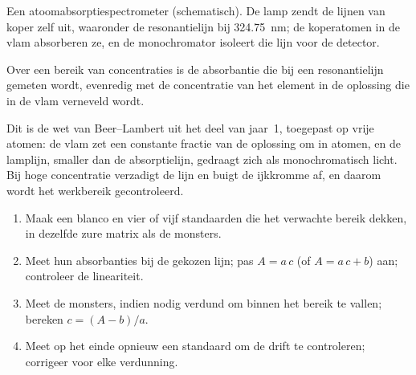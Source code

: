 \begin{omfigure}
\par\vspace{4pt}

{\small Een atoomabsorptiespectrometer (schematisch). De lamp zendt de lijnen van koper zelf uit, waaronder
de resonantielijn bij \qty{324.75}{nm}; de koperatomen in de vlam absorberen ze, en de
monochromator isoleert die lijn voor de detector.}
\end{omfigure}

\begin{proposition}\label{prop:b2:mass-spec-atomic:aas}
Over een bereik van concentraties is de absorbantie die bij een resonantielijn gemeten wordt, evenredig met de
concentratie van het element in de oplossing die in de vlam verneveld wordt.
\end{proposition}

\admitted

Dit is de wet van Beer--Lambert uit het deel van jaar~1, toegepast op vrije atomen: de vlam zet een constante
fractie van de oplossing om in atomen, en de lamplijn, smaller dan de absorptielijn, gedraagt zich als
monochromatisch licht. Bij hoge concentratie verzadigt de lijn en buigt de ijkkromme af, en daarom
wordt het werkbereik gecontroleerd.

\begin{method}\label{met:b2:mass-spec-atomic:aas-calibration}
\begin{enumerate}
  \item Maak een blanco en vier of vijf standaarden die het verwachte bereik dekken, in dezelfde zure
        matrix als de monsters.
  \item Meet hun absorbanties bij de gekozen lijn; pas $A = a\,c$ (of $A = a\,c + b$) aan; controleer de
        lineariteit.
  \item Meet de monsters, indien nodig verdund om binnen het bereik te vallen; bereken $c = (A - b)/a$.
  \item Meet op het einde opnieuw een standaard om de drift te controleren; corrigeer voor elke verdunning.
\end{enumerate}
\end{method}


